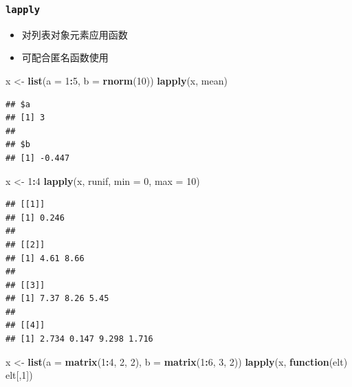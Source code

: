 \documentclass[]{book}
\newenvironment{Shaded}{\begin{snugshade}}{\end{snugshade}}
\newcommand{\ControlFlowTok}[1]{\textcolor[rgb]{0.13,0.29,0.53}{\textbf{#1}}}
\newcommand{\DataTypeTok}[1]{\textcolor[rgb]{0.13,0.29,0.53}{#1}}
\newcommand{\DecValTok}[1]{\textcolor[rgb]{0.00,0.00,0.81}{#1}}
\newcommand{\KeywordTok}[1]{\textcolor[rgb]{0.13,0.29,0.53}{\textbf{#1}}}
\newcommand{\NormalTok}[1]{#1}
\newcommand{\OperatorTok}[1]{\textcolor[rgb]{0.81,0.36,0.00}{\textbf{#1}}}
\newcommand{\StringTok}[1]{\textcolor[rgb]{0.31,0.60,0.02}{#1}}
\providecommand{\tightlist}{%
  \setlength{\itemsep}{0pt}\setlength{\parskip}{0pt}}
\begin{document}
\hypertarget{lapply}{%
\subsubsection{\texorpdfstring{\texttt{lapply}}{lapply}}\label{lapply}}

\begin{itemize}
\tightlist
\item
  对列表对象元素应用函数
\item
  可配合匿名函数使用
\end{itemize}

\begin{Shaded}
\begin{Highlighting}[]
\NormalTok{x <-}\StringTok{ }\KeywordTok{list}\NormalTok{(}\DataTypeTok{a =} \DecValTok{1}\OperatorTok{:}\DecValTok{5}\NormalTok{, }\DataTypeTok{b =} \KeywordTok{rnorm}\NormalTok{(}\DecValTok{10}\NormalTok{))}
\KeywordTok{lapply}\NormalTok{(x, mean)}
\end{Highlighting}
\end{Shaded}

\begin{verbatim}
## $a
## [1] 3
## 
## $b
## [1] -0.447
\end{verbatim}

\begin{Shaded}
\begin{Highlighting}[]
\NormalTok{x <-}\StringTok{ }\DecValTok{1}\OperatorTok{:}\DecValTok{4}
\KeywordTok{lapply}\NormalTok{(x, runif, }\DataTypeTok{min =} \DecValTok{0}\NormalTok{, }\DataTypeTok{max =} \DecValTok{10}\NormalTok{)}
\end{Highlighting}
\end{Shaded}

\begin{verbatim}
## [[1]]
## [1] 0.246
## 
## [[2]]
## [1] 4.61 8.66
## 
## [[3]]
## [1] 7.37 8.26 5.45
## 
## [[4]]
## [1] 2.734 0.147 9.298 1.716
\end{verbatim}

\begin{Shaded}
\begin{Highlighting}[]
\NormalTok{x <-}\StringTok{ }\KeywordTok{list}\NormalTok{(}\DataTypeTok{a =} \KeywordTok{matrix}\NormalTok{(}\DecValTok{1}\OperatorTok{:}\DecValTok{4}\NormalTok{, }\DecValTok{2}\NormalTok{, }\DecValTok{2}\NormalTok{), }\DataTypeTok{b =} \KeywordTok{matrix}\NormalTok{(}\DecValTok{1}\OperatorTok{:}\DecValTok{6}\NormalTok{, }\DecValTok{3}\NormalTok{, }\DecValTok{2}\NormalTok{))}
\KeywordTok{lapply}\NormalTok{(x, }\ControlFlowTok{function}\NormalTok{(elt) elt[,}\DecValTok{1}\NormalTok{])}
\end{Highlighting}
\end{Shaded}
\end{document}
